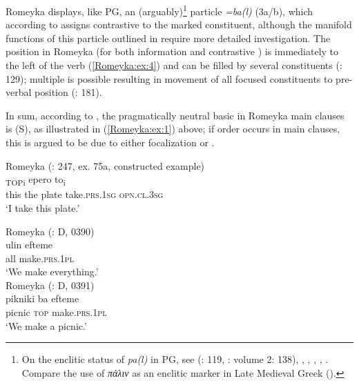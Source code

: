 \documentclass[output=paper,colorlinks,citecolor=brown]{langscibook}
\begin{document}
Romeyka displays, like PG, an (arguably)\footnote{On the enclitic status of \textit{pa(l)} in PG, see \citeauthor{papadopoulos1955} (\citeyear{papadopoulos1955}: 119, \citeyear{papadopoulos1958-1961}: volume 2: 138), \citet{setatos1994}, \citet[46, 434]{drettasPontic1997}, \citet[225--226]{Janse2002Aspects}, \citet[131--132]{ralli2006syntactic}, \citet[263]{kaltsaTopicalization2010}. Compare the use of \textit{πάλιν} as an enclitic  marker in Late Medieval Greek (\citealt{solticLate2013}).}   particle \textit{=ba(l)} (3a/b), which according to \citet[120]{neocleous_word_2020} assigns contrastive  to the marked constituent, although the manifold functions of this particle outlined in \citet[141--143]{schreibergrammar2022} require more detailed investigation. The  position in Romeyka (for both information and contrastive ) is immediately to the left of the verb (\ref{Romeyka:ex:4}) and can be filled by several constituents (\citealt{neocleous_word_2020}: 129); multiple  is possible resulting in movement of all focused constituents to pre-verbal position (\citealt{neocleous_word_2020}: 181).

In sum, according to \citet{neocleous_word_2020,neocleousEvolution2022}, the pragmatically neutral basic  in Romeyka main clauses is (S), as illustrated in (\ref{Romeyka:ex:1}) above; if  order occurs in main clauses, this is argued to be due to either focalization or . 


\newpage
\ea\label{Romeyka:ex:2}
Romeyka (\citealt{schreibergrammar2022}: 247, ex. 75a, constructed example) \\
\textsubscript{TOPi} epero to\textsubscript{i} \\
this the plate take\textsc{.prs.1sg} \textsc{opn.cl.3sg} \\
\glt `I take this plate.'  \\
\z

\ea\label{Romeyka:ex:3}
\ea\label{Romeyka:ex:3a}
Romeyka (\citealt{schreiber2021pontic}: D, 0390) \\
\gll ulin efteme \\
all make\textsc{.prs.1pl} \\
\glt `We make everything.'  \\
\ex\label{Romeyka:ex:3b}
Romeyka (\citealt{schreiber2021pontic}: D, 0391) \\
\gll pikniki ba efteme \\
picnic \textsc{top} make\textsc{.prs.1pl} \\
\glt `We make a picnic.'
\z
\z
\end{document}
